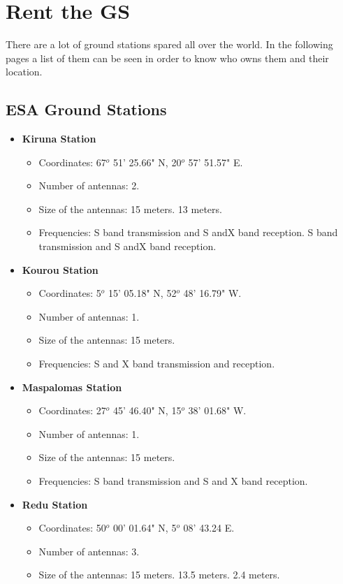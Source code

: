 \section{Rent the GS}
There are a lot of ground stations spared all over the world. In the following pages a list of them can be seen in order to know who owns  them and their location. 
\subsection{ESA Ground Stations}
\begin{itemize}
\item \textbf{Kiruna Station}
\begin{itemize}
\item Coordinates: 67$^{o}$ 51' 25.66" N, 20$^{o}$ 57' 51.57" E.
\item Number of antennas: 2.
\item Size of the antennas: 15 meters. 13 meters.
\item Frequencies: S band transmission and S andX band reception. S band transmission and S andX band reception.
\end{itemize}
\item \textbf{Kourou Station}
\begin{itemize}
\item Coordinates: 5$^{o}$ 15' 05.18" N, 52$^{o}$ 48' 16.79" W.
\item Number of antennas: 1.
\item Size of the antennas: 15 meters.
\item Frequencies: S and X band transmission and reception.
\end{itemize}
\item \textbf{Maspalomas Station}
\begin{itemize}
\item Coordinates: 27$^{o}$ 45' 46.40" N, 15$^{o}$ 38' 01.68" W.
\item Number of antennas: 1.
\item Size of the antennas: 15 meters.
\item Frequencies: S band transmission and S and X band reception.
\end{itemize}
\item \textbf{Redu Station}
\begin{itemize}
\item Coordinates: 50$^{o}$ 00' 01.64" N, 5$^{o}$ 08' 43.24 E.
\item Number of antennas: 3.
\item Size of the antennas: 15 meters. 13.5 meters. 2.4 meters.

\end{itemize}
\end{itemize}

